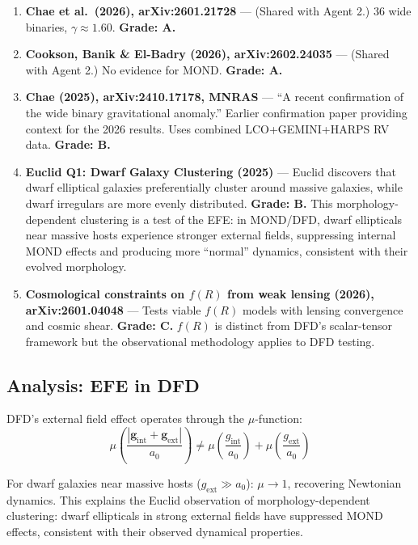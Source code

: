 \documentclass[11pt,a4paper]{article}
\begin{document}
\begin{enumerate}

\item \textbf{Chae et al.\ (2026), arXiv:2601.21728} --- (Shared with Agent 2.) 36 wide binaries, $\gamma \approx 1.60$. \textbf{Grade: A.}

\item \textbf{Cookson, Banik \& El-Badry (2026), arXiv:2602.24035} --- (Shared with Agent 2.) No evidence for MOND. \textbf{Grade: A.}

\item \textbf{Chae (2025), arXiv:2410.17178, MNRAS} --- ``A recent confirmation of the wide binary gravitational anomaly.'' Earlier confirmation paper providing context for the 2026 results. Uses combined LCO+GEMINI+HARPS RV data. \textbf{Grade: B.}

\item \textbf{Euclid Q1: Dwarf Galaxy Clustering (2025)} --- Euclid discovers that dwarf elliptical galaxies preferentially cluster around massive galaxies, while dwarf irregulars are more evenly distributed. \textbf{Grade: B.} This morphology-dependent clustering is a test of the EFE: in MOND/DFD, dwarf ellipticals near massive hosts experience stronger external fields, suppressing internal MOND effects and producing more ``normal'' dynamics, consistent with their evolved morphology.

\item \textbf{Cosmological constraints on $f(R)$ from weak lensing (2026), arXiv:2601.04048} --- Tests viable $f(R)$ models with lensing convergence and cosmic shear. \textbf{Grade: C.} $f(R)$ is distinct from DFD's scalar-tensor framework but the observational methodology applies to DFD testing.

\end{enumerate}

\subsection{Analysis: EFE in DFD}

DFD's external field effect operates through the $\mu$-function:
\begin{equation}
\mu\left(\frac{|\mathbf{g}_\mathrm{int} + \mathbf{g}_\mathrm{ext}|}{a_0}\right) \neq \mu\left(\frac{g_\mathrm{int}}{a_0}\right) + \mu\left(\frac{g_\mathrm{ext}}{a_0}\right)
\end{equation}

For dwarf galaxies near massive hosts ($g_\mathrm{ext} \gg a_0$): $\mu \to 1$, recovering Newtonian dynamics. This explains the Euclid observation of morphology-dependent clustering: dwarf ellipticals in strong external fields have suppressed MOND effects, consistent with their observed dynamical properties.
\end{document}
